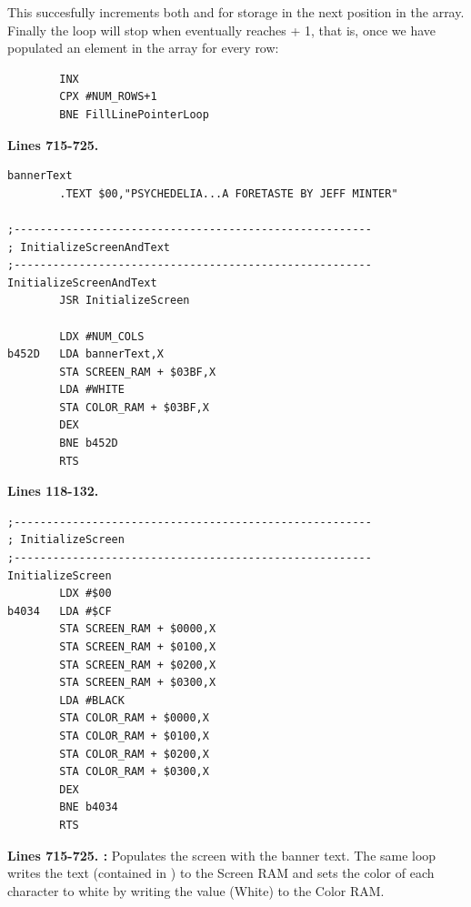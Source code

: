 This succesfully increments both  and  for storage in the next position in
the array. Finally the loop will stop when  eventually reaches  + 1, that is, once we have
populated an element in the array for every row:

\begin{lstlisting}
        INX 
        CPX #NUM_ROWS+1
        BNE FillLinePointerLoop
\end{lstlisting}
%

\clearpage
\textbf{Lines 715-725. }
\begin{lstlisting}[caption = A routine that fills the screen with black and the title text.]
bannerText   
        .TEXT $00,"PSYCHEDELIA...A FORETASTE BY JEFF MINTER"

;-------------------------------------------------------
; InitializeScreenAndText
;-------------------------------------------------------
InitializeScreenAndText   
        JSR InitializeScreen

        LDX #NUM_COLS
b452D   LDA bannerText,X
        STA SCREEN_RAM + $03BF,X
        LDA #WHITE
        STA COLOR_RAM + $03BF,X
        DEX 
        BNE b452D
        RTS 
\end{lstlisting}

\bigskip
\bigskip
\bigskip
\bigskip
\bigskip
\textbf{Lines 118-132. }
\begin{lstlisting}[caption = Fills the screen with black]
;-------------------------------------------------------
; InitializeScreen
;-------------------------------------------------------
InitializeScreen   
        LDX #$00
b4034   LDA #$CF
        STA SCREEN_RAM + $0000,X
        STA SCREEN_RAM + $0100,X
        STA SCREEN_RAM + $0200,X
        STA SCREEN_RAM + $0300,X
        LDA #BLACK
        STA COLOR_RAM + $0000,X
        STA COLOR_RAM + $0100,X
        STA COLOR_RAM + $0200,X
        STA COLOR_RAM + $0300,X
        DEX 
        BNE b4034
        RTS 

\end{lstlisting}
\clearpage

\textbf{Lines 715-725. :} Populates the screen with the banner text. The same loop writes
the text (contained in ) to the Screen RAM and sets the color of each character to white by writing the
value  (White) to the Color RAM.

